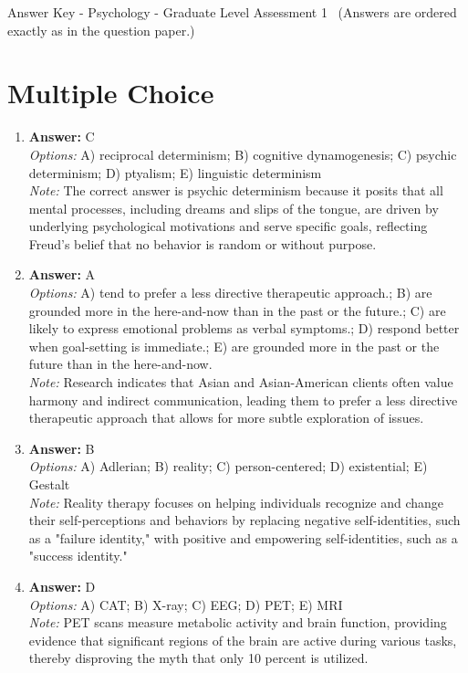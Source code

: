 \documentclass[12pt]{article}
\begin{document}
\begin{center}
Answer Key - Psychology - Graduate Level Assessment 1 \
\small (Answers are ordered exactly as in the question paper.)
\end{center}

\section*{Multiple Choice}
\begin{enumerate}[label=\arabic*.]
\item \textbf{Answer:} C
\\ \textit{Options:} A) reciprocal determinism; B) cognitive dynamogenesis; C) psychic determinism; D) ptyalism; E) linguistic determinism
\\ \textit{Note:} The correct answer is psychic determinism because it posits that all mental processes, including dreams and slips of the tongue, are driven by underlying psychological motivations and serve specific goals, reflecting Freud's belief that no behavior is random or without purpose.
\item \textbf{Answer:} A
\\ \textit{Options:} A) tend to prefer a less directive therapeutic approach.; B) are grounded more in the here-and-now than in the past or the future.; C) are likely to express emotional problems as verbal symptoms.; D) respond better when goal-setting is immediate.; E) are grounded more in the past or the future than in the here-and-now.
\\ \textit{Note:} Research indicates that Asian and Asian-American clients often value harmony and indirect communication, leading them to prefer a less directive therapeutic approach that allows for more subtle exploration of issues.
\item \textbf{Answer:} B
\\ \textit{Options:} A) Adlerian; B) reality; C) person-centered; D) existential; E) Gestalt
\\ \textit{Note:} Reality therapy focuses on helping individuals recognize and change their self-perceptions and behaviors by replacing negative self-identities, such as a "failure identity," with positive and empowering self-identities, such as a "success identity."
\item \textbf{Answer:} D
\\ \textit{Options:} A) CAT; B) X-ray; C) EEG; D) PET; E) MRI
\\ \textit{Note:} PET scans measure metabolic activity and brain function, providing evidence that significant regions of the brain are active during various tasks, thereby disproving the myth that only 10 percent is utilized.

\end{enumerate}
\end{document}
